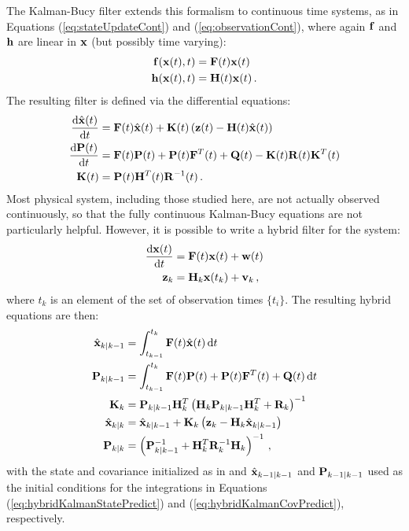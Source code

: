 The Kalman-Bucy filter extends this formalism to continuous time systems, as in Equations (\ref{eq:stateUpdateCont}) and (\ref{eq:observationCont}), where again $\mathbf f$ and $\mathbf h$ are linear in $\mathbf x$ (but possibly time varying):
\begin{align}
\mathbf f(\mathbf x(t),t) &= \mathbf F(t) \mathbf x(t) \label{eq:linStateUpdateCont}\\
\mathbf h(\mathbf x(t),t) &= \mathbf H(t) \mathbf x(t) \,.
\end{align}
The resulting filter is defined via the differential equations:
\begin{align}
\frac{\mathrm{d}\hat{\mathbf x}(t)}{\mathrm{d}t} &= \mathbf F(t)\hat{\mathbf x}(t) + \mathbf K(t) \left( \mathbf z(t) - \mathbf H(t) \hat{\mathbf x}(t)\right) \\
\frac{\mathrm{d}\mathbf P(t)}{\mathrm{d}t} &=  \mathbf F(t)\mathbf P(t) + \mathbf P(t) \mathbf F^T(t) + \mathbf Q(t) -  \mathbf K(t) \mathbf R(t) \mathbf K^T(t) \\
\mathbf K(t) &= \mathbf P(t) \mathbf H^T(t) \mathbf R^{-1}(t) \,.
\end{align}
Most physical system, including those studied here, are not actually observed continuously, so that the fully continuous Kalman-Bucy equations are not particularly helpful.  However, it is possible to write a hybrid filter for the system:
\begin{align}
\frac{\mathrm{d}\mathbf x(t)}{\mathrm{d}t}  &= \mathbf F(t) \mathbf x(t) + \mathbf w(t) \\
\mathbf z_k &= \mathbf H_k\mathbf x(t_k) + \mathbf v_k \,,
\end{align}
where $t_k$ is an element of the set of observation times $\{t_i\}$.  The resulting hybrid equations are then:
\begin{align}
\hat{\mathbf x}_{k|k-1} &= \int_{t_{k-1}}^{t_k} \mathbf F(t)\hat{\mathbf x}(t) \,\mathrm{d}t \label{eq:hybridKalmanStatePredict}\\
\mathbf P_{k|k-1} &=  \int_{t_{k-1}}^{t_k}  \mathbf F(t)\mathbf P(t) + \mathbf P(t) \mathbf F^T(t) + \mathbf Q(t) \,\mathrm{d}t \label{eq:hybridKalmanCovPredict} \\
\mathbf K_k &= \mathbf P_{k|k-1} \mathbf H_k^T \left(\mathbf H_k \mathbf P_{k|k-1} \mathbf H_k^T + \mathbf R_k\right)^{-1}  \\
\hat{\mathbf x}_{k|k} &= \hat{\mathbf x}_{k|k-1} + \mathbf K_k \left( \mathbf z_k - \mathbf H_k \hat{\mathbf x}_{k|k-1}\right) \\
\mathbf P_{k|k} &= \left(\mathbf P_{k|k-1}^{-1} + \mathbf H_k^T \mathbf R_k^{-1} \mathbf H_k \right)^{-1} \label{eq:hybridKalmanCovUpdate} \,,
\end{align}
with the state and covariance initialized as in  and $\hat{\mathbf x}_{k-1|k-1}$ and $\mathbf P_{k-1|k-1}$ used as the initial conditions for the integrations in Equations (\ref{eq:hybridKalmanStatePredict}) and (\ref{eq:hybridKalmanCovPredict}), respectively.


